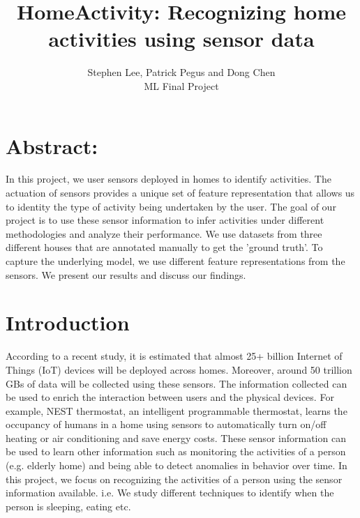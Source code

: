 \documentclass[11pt, oneside]{article}   	%
\title{HomeActivity: Recognizing home activities using sensor data}
\author{Stephen Lee, Patrick Pegus and Dong Chen\\ 
ML Final Project}
\begin{document}
\maketitle
\section{Abstract:}

In this project, we user sensors deployed in homes to identify activities. The actuation of sensors provides a unique set of feature representation that allows us to identity 
the type of activity being undertaken by the user. The goal of our project is to use these sensor information to infer activities under different methodologies and analyze their 
performance.  We use datasets from three different houses that are annotated manually to get the 'ground truth'.  To capture the underlying model, we use different feature representations from the sensors. We present our results and discuss our findings. 
 


\section{Introduction}
According to a recent study,  it is estimated that almost 25+ billion Internet of Things (IoT) devices will be deployed across homes. Moreover, around 50 trillion GBs of 
data will be collected using these sensors. The information collected can be used to enrich the interaction between users and the physical devices. For example, NEST thermostat, 
an intelligent programmable thermostat, learns the occupancy of humans in a home using sensors to automatically turn on/off heating or air conditioning and save energy costs. These sensor information can be used to learn other information such as monitoring the activities of a person (e.g. elderly home) and being able to detect anomalies in behavior over time. In this project, we focus on recognizing the activities of a person using the sensor information available. i.e. We study different techniques to identify when the person is sleeping, eating etc. 
\end{document}
